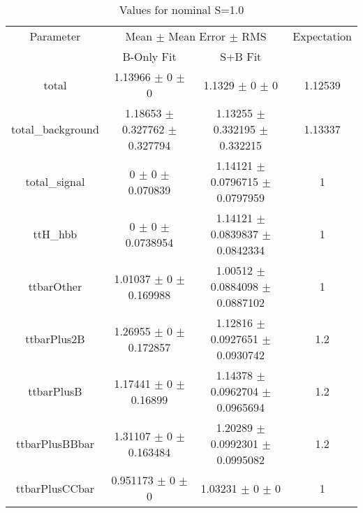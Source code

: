 \begin{table}
\centering
\caption{Values for nominal S=1.0}
\begin{tabular}{cccc}
\toprule
Parameter & \multicolumn{2}{c}{Mean $\pm$ Mean Error $\pm$ RMS} & Expectation\\
 & B-Only Fit & S+B Fit & \\
\midrule
total & \num{1.13966} $\pm$ \num{0} $\pm$ \num{0} & \num{1.1329} $\pm$ \num{0} $\pm$ \num{0} & \num{1.12539}\\
total\_background & \num{1.18653} $\pm$ \num{0.327762} $\pm$ \num{0.327794} & \num{1.13255} $\pm$ \num{0.332195} $\pm$ \num{0.332215} & \num{1.13337}\\
total\_signal & \num{0} $\pm$ \num{0} $\pm$ \num{0.070839} & \num{1.14121} $\pm$ \num{0.0796715} $\pm$ \num{0.0797959} & \num{1}\\
ttH\_hbb & \num{0} $\pm$ \num{0} $\pm$ \num{0.0738954} & \num{1.14121} $\pm$ \num{0.0839837} $\pm$ \num{0.0842334} & \num{1}\\
ttbarOther & \num{1.01037} $\pm$ \num{0} $\pm$ \num{0.169988} & \num{1.00512} $\pm$ \num{0.0884098} $\pm$ \num{0.0887102} & \num{1}\\
ttbarPlus2B & \num{1.26955} $\pm$ \num{0} $\pm$ \num{0.172857} & \num{1.12816} $\pm$ \num{0.0927651} $\pm$ \num{0.0930742} & \num{1.2}\\
ttbarPlusB & \num{1.17441} $\pm$ \num{0} $\pm$ \num{0.16899} & \num{1.14378} $\pm$ \num{0.0962704} $\pm$ \num{0.0965694} & \num{1.2}\\
ttbarPlusBBbar & \num{1.31107} $\pm$ \num{0} $\pm$ \num{0.163484} & \num{1.20289} $\pm$ \num{0.0992301} $\pm$ \num{0.0995082} & \num{1.2}\\
ttbarPlusCCbar & \num{0.951173} $\pm$ \num{0} $\pm$ \num{0} & \num{1.03231} $\pm$ \num{0} $\pm$ \num{0} & \num{1}\\
\bottomrule
\end{tabular}
\end{table}